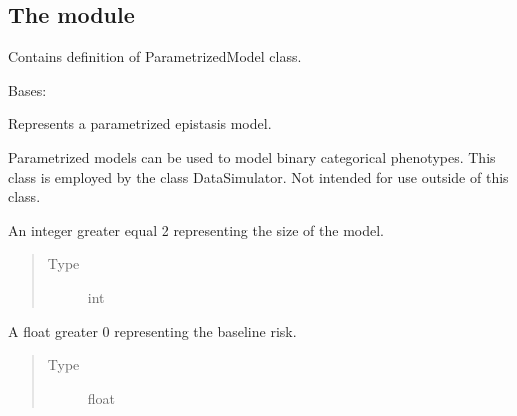 \documentclass[a4paper,10pt,english]{sphinxhowto}
\begin{document}
\subsection{The module }
\label{\detokenize{utils:module-utils.parametrized_model}}\label{\detokenize{utils:the-module-utils-parametrized-model-py}}
Contains definition of ParametrizedModel class.

\begin{fulllineitems}
\label{\detokenize{utils:utils.parametrized_model.ParametrizedModel}}
Bases: 

Represents a parametrized epistasis model.

Parametrized models can be used to model binary categorical phenotypes.
This class is employed by the class DataSimulator.
Not intended for use outside of this class.

\begin{fulllineitems}
\label{\detokenize{utils:utils.parametrized_model.ParametrizedModel.size}}
An integer greater equal 2 representing the size of the model.
\begin{quote}\begin{description}
\item[{Type}] \leavevmode
int

\end{description}\end{quote}

\end{fulllineitems}


\begin{fulllineitems}
\label{\detokenize{utils:utils.parametrized_model.ParametrizedModel.baseline_alpha}}
A float greater 0 representing the baseline risk.
\begin{quote}\begin{description}
\item[{Type}] \leavevmode
float


\end{description}
\end{quote}
\end{fulllineitems}
\end{fulllineitems}
\end{document}
